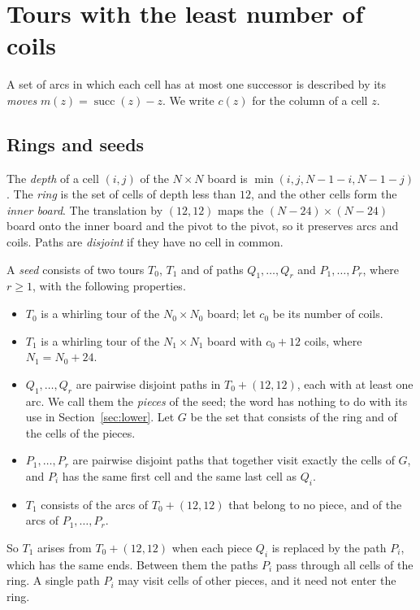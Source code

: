 \documentclass[11pt]{amsart}
\theoremstyle{remark}
\begin{document}
\section{Tours with the least number of coils}\label{sec:half}

A set of arcs in which each cell has at most one successor is described by
its \emph{moves} $m(z)=\operatorname{succ}(z)-z$. We write $c(z)$ for the column of a cell $z$.

\subsection*{Rings and seeds}
The \emph{depth} of a cell $(i,j)$ of the $N\times N$ board is $\min(i,j,N-1-i,N-1-j)$. The \emph{ring} is the set
of cells of depth less than $12$, and the other cells form the \emph{inner board}. The translation by $(12,12)$ maps
the $(N-24)\times(N-24)$ board onto the inner board and the pivot to the pivot, so it preserves arcs and coils.
Paths are \emph{disjoint} if they have no cell in common.

A \emph{seed} consists of two tours $T_0$, $T_1$ and of paths $Q_1,\dots,Q_r$ and $P_1,\dots,P_r$, where $r\ge1$,
with the following properties.
\begin{itemize}
\item $T_0$ is a whirling tour of the $N_0\times N_0$ board; let $c_0$ be its number of coils.
\item $T_1$ is a whirling tour of the $N_1\times N_1$ board with $c_0+12$ coils, where $N_1=N_0+24$.
\item $Q_1,\dots,Q_r$ are pairwise disjoint paths in $T_0+(12,12)$, each with at least one arc. We call them the
\emph{pieces} of the seed; the word has nothing to do with its use in Section~\ref{sec:lower}. Let $G$ be the set
that consists of the ring and of the cells of the pieces.
\item $P_1,\dots,P_r$ are pairwise disjoint paths that together visit exactly the cells of $G$, and $P_i$ has the
same first cell and the same last cell as $Q_i$.
\item $T_1$ consists of the arcs of $T_0+(12,12)$ that belong to no piece, and of the arcs of $P_1,\dots,P_r$.
\end{itemize}
So $T_1$ arises from $T_0+(12,12)$ when each piece $Q_i$ is replaced by the path $P_i$, which has the same ends.
Between them the paths $P_i$ pass through all cells of the ring. A single path $P_i$ may visit cells of other pieces,
and it need not enter the ring.
\end{document}
